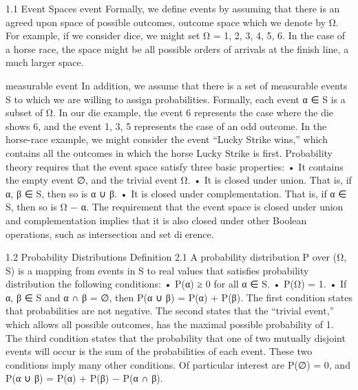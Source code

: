 1.1 Event Spaces
event Formally, we define events by assuming that there is an agreed upon space of possible outcomes, outcome space which we denote by Ω. For example, if we consider dice, we might set Ω = {1, 2, 3, 4, 5, 6}. In the case of a horse race, the space might be all possible orders of arrivals at the finish line, a much larger space.

measurable event In addition, we assume that there is a set of measurable events S to which we are willing to assign probabilities. Formally, each event α ∈ S is a subset of Ω. In our die example, the event {6} represents the case where the die shows 6, and the event {1, 3, 5} represents the case of an odd outcome. In the horse-race example, we might consider the event “Lucky Strike wins,” which contains all the outcomes in which the horse Lucky Strike is first. Probability theory requires that the event space satisfy three basic properties: • It contains the empty event ∅, and the trivial event Ω. • It is closed under union. That is, if α, β ∈ S, then so is α ∪ β. • It is closed under complementation. That is, if α ∈ S, then so is Ω − α. The requirement that the event space is closed under union and complementation implies that it is also closed under other Boolean operations, such as intersection and set dierence.

1.2 Probability Distributions
Definition 2.1 A probability distribution P over (Ω, S) is a mapping from events in S to real values that satisfies probability distribution the following conditions: • P(α) ≥ 0 for all α ∈ S. • P(Ω) = 1. • If α, β ∈ S and α ∩ β = ∅, then P(α ∪ β) = P(α) + P(β). The first condition states that probabilities are not negative. The second states that the “trivial event,” which allows all possible outcomes, has the maximal possible probability of 1. The third condition states that the probability that one of two mutually disjoint events will occur is the sum of the probabilities of each event. These two conditions imply many other conditions. Of particular interest are P(∅) = 0, and P(α ∪ β) = P(α) + P(β) − P(α ∩ β).

